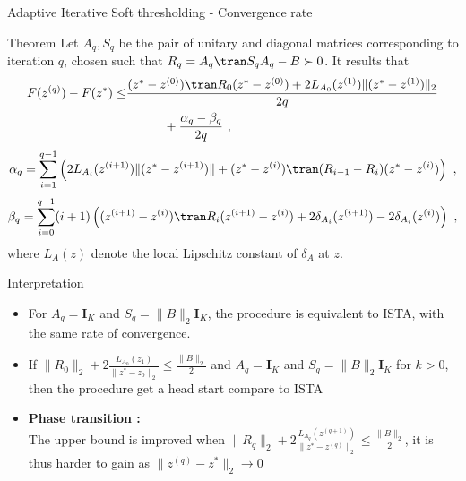 \documentclass[ignorenonframetext]{beamer}
\begin{document}
\begin{frame}{Adaptive Iterative Soft thresholding - Convergence rate}

    \begin{block}{Theorem}
    Let $A_q, S_q$ be the pair of unitary and diagonal matrices corresponding to iteration $q$, 
chosen such that $R_q = A_q\tran S_q A_q - B \succ 0$.
It results that
{\small 
\begin{equation*}
\label{zo1}
	\begin{split}
		F(z^{(q)}) - F(z^*) \leq &\frac{(z^*- z^{(0)})\tran R_0 (z^* - z^{(0)}) + 2 L_{A_0}(z^{(1)}) \|  (z^*-z^{(1)}) \|_2 }{2q}\\
			&\hskip3em + \frac{\alpha_q - \beta_q}{2q}~,
	\end{split}
\end{equation*}
\[\alpha_q = \sum_{i=1}^{q-1} \left(  2L_{A_i}(z^{(i+1)})\|(z^*-z^{(i+1)}) \| + (z^* - z^{(i)})\tran ( R_{i-1} - R_{i}) (z^* - z^{(i)}) \right)~,\]
\[\beta_q = \sum_{i=0}^{q-1} (i+1)\left((z^{(i+1)}-z^{(i)})\tran R_i (z^{(i+1)}-z^{(i)}) + 2\delta_{A_i}(z^{(i+1)}) - 2\delta_{A_i}(z^{(i)}) \right)~,\]}
where $L_A(z)$ denote the local Lipschitz constant of $\delta_A$ at $z$.
    \end{block}
\end{frame}

\begin{frame}{Interpretation}

	\begin{itemize}\itemsep2em
		\item For $A_q = \pmb I_K$ and $S_q = \|B\|_2 \pmb I_K$, the procedure is
		equivalent to ISTA, with the same rate of convergence.
		\item If $\displaystyle\|R_0\|_2 + 2 \frac{L_{A_0}(z_1)}{\|z^*-z_0\|_2} \le \frac{\|B\|_2}{2}$
			  and $A_q = \pmb I_K$ and $S_q = \|B\|_2 \pmb I_K$ for $k >0$, then the procedure get a
			  head start compare to ISTA
		\item {\bf Phase transition :}\\
		The upper bound is improved when
		$\displaystyle\|R_q\|_2 + 2 \frac{L_{A_q}(z^{(q+1)})}{\|z^*-z^{(q)}\|_2} \le \frac{\|B\|_2}{2}$,
		it is thus harder to gain as $\|z^{(q)} - z^*\|_2 \to 0$
	\end{itemize}
	
\end{frame}
\end{document}
